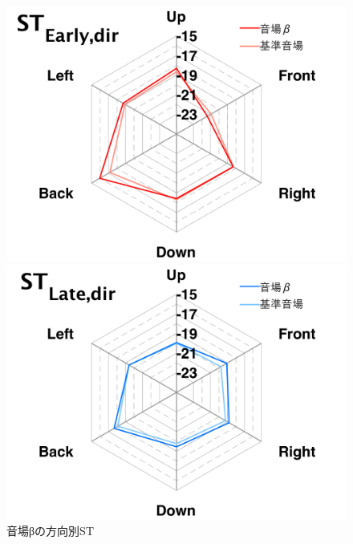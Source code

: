 \documentclass[11pt,a4j]{jreport}
\begin{document}
\begin{figure}[H]
  \begin{minipage}[b]{.5\linewidth}
    \centering
    \includegraphics[width=1\linewidth]{images/experimentField/withLegend/02betaOnBaseEarly.pdf}
  \end{minipage}%
  \begin{minipage}[b]{.5\linewidth}
    \centering
    \includegraphics[width=1\linewidth]{images/experimentField/withLegend/06betaOnBaseLate.pdf}
  \end{minipage}
  \caption{音場βの方向別ST}
  \label{fig:音場βの方向別ST}
\end{figure}
\end{document}
